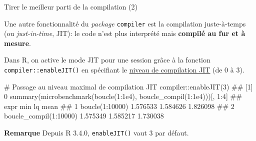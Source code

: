 \documentclass[12pt,ignorenonframetext,]{beamer}
\newenvironment{Shaded}{}{}
\newcommand{\CommentTok}[1]{\textcolor[rgb]{0.00,0.50,0.00}{#1}}
\newcommand{\DecValTok}[1]{#1}
\newcommand{\FloatTok}[1]{#1}
\newcommand{\KeywordTok}[1]{\textcolor[rgb]{0.00,0.00,1.00}{#1}}
\newcommand{\NormalTok}[1]{#1}
\newcommand{\OperatorTok}[1]{#1}
\renewenvironment{Shaded}{\begin{snugshade}}{\end{snugshade}}
\newcommand{\intertitre}[1]{\textcolor{redInsee}{\textbf{#1}}}
\begin{document}
\begin{frame}[fragile]{Tirer le meilleur parti de la compilation (2)}
\protect\hypertarget{tirer-le-meilleur-parti-de-la-compilation-2}{}

Une autre fonctionnalité du \emph{package} \texttt{compiler} est la
compilation \og juste-à-temps \fg{} (ou \textit{just-in-time}, JIT): le
code n’est plus interprété mais \textbf{compilé au fur et à mesure}.

\bigskip \pause Dans R, on active le mode JIT pour une session grâce à
la fonction \texttt{compiler::enableJIT()} en spécifiant le
\href{https://stat.ethz.ch/R-manual/R-devel/library/compiler/html/compile.html}{\underline{niveau de compilation JIT}}
(de 0 à 3).

\pause \footnotesize

\begin{Shaded}
\begin{Highlighting}[]
\CommentTok{# Passage au niveau maximal de compilation JIT}
\NormalTok{compiler}\OperatorTok{::}\KeywordTok{enableJIT}\NormalTok{(}\DecValTok{3}\NormalTok{)}
\NormalTok{  ## [1] 0}
\KeywordTok{summary}\NormalTok{(}\KeywordTok{microbenchmark}\NormalTok{(}\KeywordTok{boucle}\NormalTok{(}\DecValTok{1}\OperatorTok{:}\FloatTok{1e4}\NormalTok{), }\KeywordTok{boucle_compil}\NormalTok{(}\DecValTok{1}\OperatorTok{:}\FloatTok{1e4}\NormalTok{)))[, }\DecValTok{1}\OperatorTok{:}\DecValTok{4}\NormalTok{]}
\NormalTok{  ##                     expr      min       lq     mean}
\NormalTok{  ## 1        boucle(1:10000) 1.576533 1.584626 1.826098}
\NormalTok{  ## 2 boucle_compil(1:10000) 1.575349 1.585217 1.730038}
\end{Highlighting}
\end{Shaded}

\pause \small \intertitre{Remarque} Depuis R 3.4.0, \texttt{enableJIT()}
vaut 3 par défaut.

\end{frame}
\end{document}
